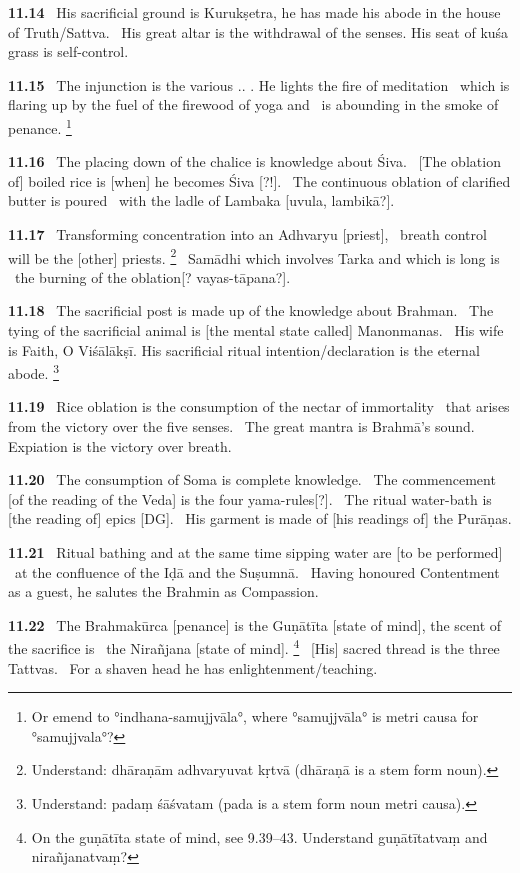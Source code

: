 \documentclass{article}
\begin{document}
\textbf{11.14}%
\ His sacrificial ground is Kurukṣetra, he has made his abode in the house of Truth/Sattva.%
\ His great altar is the withdrawal of the senses. His seat of kuśa grass is self-control.%


\textbf{11.15}%
\ The injunction is the various .. . He lights the fire of meditation%
\ which is flaring up by the fuel of the firewood of yoga and%
\              is abounding in the smoke of penance.%
\footnote{Or emend to °indhana-samujjvāla°, where °samujjvāla° is metri causa for °samujjvala°? }%


\textbf{11.16}%
\ The placing down of the chalice is knowledge about Śiva.%
\                                 [The oblation of] boiled rice is [when] he becomes Śiva [?!].%
\ The continuous oblation of clarified butter is poured%
\                                 with the ladle of Lambaka [uvula, lambikā?].%


\textbf{11.17}%
\ Transforming concentration into an Adhvaryu [priest],%
\              breath control will be the [other] priests.%
\footnote{Understand: dhāraṇām adhvaryuvat kṛtvā (dhāraṇā is a stem form noun). }%
\ Samādhi which involves Tarka and which is long is%
\                  the burning of the oblation[? vayas-tāpana?].%


\textbf{11.18}%
\ The sacrificial post is made up of the knowledge about Brahman.%
\              The tying of the sacrificial animal is [the mental state called] Manonmanas.%
\ His wife is Faith, O Viśālākṣī. His sacrificial ritual intention/declaration is the eternal abode.%
\footnote{Understand: padaṃ śāśvatam (pada is a stem form noun metri causa). }%


\textbf{11.19}%
\ Rice oblation is the consumption of the nectar of immortality%
\                      that arises from the victory over the five senses.%
\ The great mantra is Brahmā's sound. Expiation is the victory over breath.%


\textbf{11.20}%
\ The consumption of Soma is complete knowledge.%
\              The commencement [of the reading of the Veda] is the four yama-rules[?].%
\ The ritual water-bath is [the reading of] epics [DG].%
\              His garment is made of [his readings of] the Purāṇas.%


\textbf{11.21}%
\ Ritual bathing and at the same time sipping water are [to be performed]%
\              at the confluence of the Iḍā and the Suṣumnā.%
\ Having honoured Contentment as a guest, he salutes the Brahmin as Compassion.%


\textbf{11.22}%
\ The Brahmakūrca [penance] is the Guṇātīta [state of mind], the scent of the sacrifice is%
\                 the Nirañjana [state of mind].%
\footnote{On the guṇātīta state of mind, see 9.39--43.                 Understand guṇātītatvaṃ and nirañjanatvaṃ? }%
\ [His] sacred thread is the three Tattvas.%
\                      For a shaven head he has enlightenment/teaching.%
\end{document}
